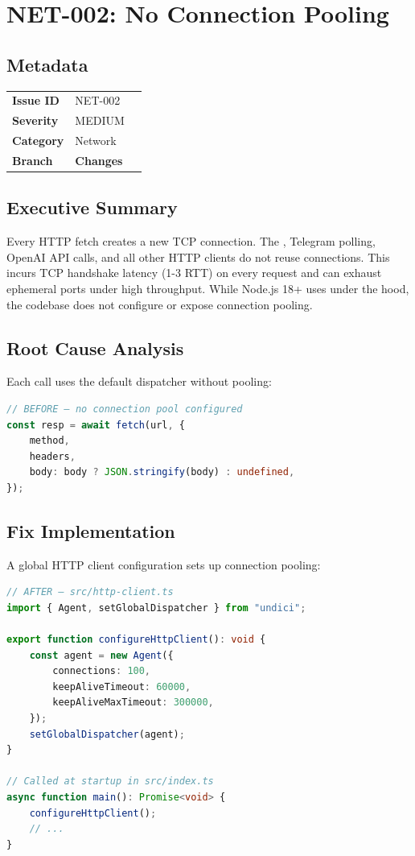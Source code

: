 \section{NET-002: No Connection Pooling}
\label{sec:net-002}
\subsection*{Metadata}
\begin{tabular}{ll}
\textbf{Issue ID} & NET-002 \\
\textbf{Severity} & MEDIUM \\
\textbf{Category} & Network \\
\textbf{Branch} & 
\textbf{Changes} &  \\
\end{tabular}

\subsection*{Executive Summary}
Every HTTP fetch creates a new TCP connection. The , Telegram polling, OpenAI API calls, and all other HTTP clients do not reuse connections. This incurs TCP handshake latency (1-3 RTT) on every request and can exhaust ephemeral ports under high throughput. While Node.js 18+  uses  under the hood, the codebase does not configure or expose connection pooling.

\subsection*{Root Cause Analysis}
Each  call uses the default dispatcher without pooling:

\begin{lstlisting}[language=TypeScript]
// BEFORE — no connection pool configured
const resp = await fetch(url, {
    method,
    headers,
    body: body ? JSON.stringify(body) : undefined,
});
\end{lstlisting}

\subsection*{Fix Implementation}
A global HTTP client configuration sets up connection pooling:

\begin{lstlisting}[language=TypeScript]
// AFTER — src/http-client.ts
import { Agent, setGlobalDispatcher } from "undici";

export function configureHttpClient(): void {
    const agent = new Agent({
        connections: 100,
        keepAliveTimeout: 60000,
        keepAliveMaxTimeout: 300000,
    });
    setGlobalDispatcher(agent);
}

// Called at startup in src/index.ts
async function main(): Promise<void> {
    configureHttpClient();
    // ...
}
\end{lstlisting}

